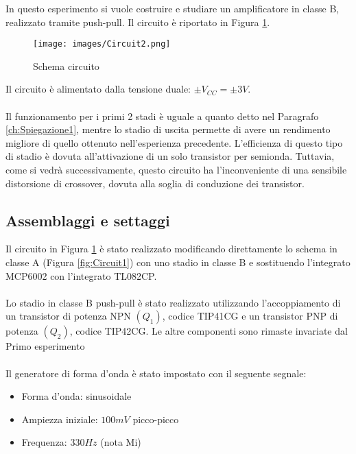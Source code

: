 In questo esperimento si vuole costruire e studiare un amplificatore in classe B, realizzato tramite push-pull. Il circuito è riportato in Figura \ref{fig:Circuit2}.
\begin{figure}[H]
    \centering
    \texttt{[image: images/Circuit2.png]}
    \caption{Schema circuito}
    \label{fig:Circuit2}
\end{figure}
Il circuito è alimentato dalla tensione duale: $\pm V_{CC}=\pm3V$.\\\\
Il funzionamento per i primi 2 stadi è uguale a quanto detto nel Paragrafo \ref{ch:Spiegazione1}, mentre lo stadio di uscita permette di avere un rendimento migliore di quello ottenuto nell'esperienza precedente. L'efficienza di questo tipo di stadio è dovuta all'attivazione di un solo transistor per semionda. Tuttavia, come si vedrà successivamente, questo circuito ha l'inconveniente di una sensibile distorsione di crossover, dovuta alla soglia di conduzione dei transistor.
\subsection{Assemblaggi e settaggi}
Il circuito in Figura \ref{fig:Circuit2} è stato realizzato modificando direttamente lo schema in classe A (Figura \ref{fig:Circuit1}) con uno stadio in classe B e sostituendo l'integrato MCP6002 con l'integrato TL082CP.\\\\
Lo stadio in classe B push-pull è stato realizzato utilizzando l'accoppiamento di un transistor di potenza NPN $(Q_1)$, codice TIP41CG e un transistor PNP di potenza $(Q_2)$, codice TIP42CG. Le altre componenti sono rimaste invariate dal Primo esperimento\\\\
Il generatore di forma d'onda è stato impostato con il seguente segnale:
\begin{itemize}
    \item Forma d'onda: sinusoidale
    \item Ampiezza iniziale: $100mV$ picco-picco
    \item Frequenza: $330Hz$ (nota Mi)
\end{itemize}
\clearpage
